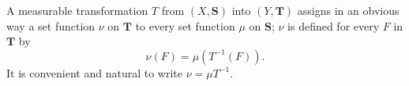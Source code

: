 A measurable transformation $T$ from $(X, \mathbf{S})$ into $(Y, \mathbf{T})$ assigns in an obvious way a set function $\nu$ on $\mathbf{T}$ to every set function $\mu$ on $\mathbf{S}$; $\nu$ is defined for every $F$ in $\mathbf{T}$ by
$$\nu(F) = \mu(T^{-1}(F)).$$
It is convenient and natural to write $\nu = \mu T^{-1}$.
